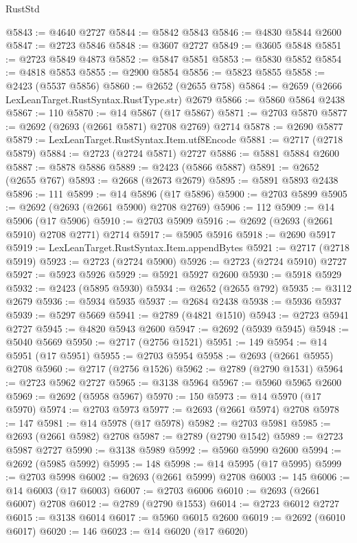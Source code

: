 \begin{lexlean}{RustStd}
\begin{coremodule}
{\begin{coremodule}
{{{{{{{{{{{{{{{{{{{{{{{{{{{{{{{{{{{{{{{@5843 := @4640 @2727
@5844 := @5842 @5843
@5846 := @4830 @5844 @2600
@5847 := @2723 @5846
@5848 := @3607 @2727
@5849 := @3605 @5848
@5851 := @2723 @5849 @4873
@5852 := @5847 @5851
@5853 := @5830 @5852
@5854 := @4818 @5853
@5855 := @2900 @5854
@5856 := @5823 @5855
@5858 := @2423 (@5537 @5856)
@5860 := @2652 (@2655 @758)
@5864 := @2659 (@2666 LexLeanTarget.RustSyntax.RustType.str) @2679
@5866 := @5860 @5864 @2438
@5867 := 110
@5870 := @14 @5867 (@17 @5867)
@5871 := @2703 @5870
@5877 := @2692 (@2693 (@2661 @5871) @2708 @2769) @2714
@5878 := @2690 @5877
@5879 := LexLeanTarget.RustSyntax.Item.utf8Encode
@5881 := @2717 (@2718 @5879)
@5884 := @2723 (@2724 @5871) @2727
@5886 := @5881 @5884 @2600
@5887 := @5878 @5886
@5889 := @2423 (@5866 @5887)
@5891 := @2652 (@2655 @767)
@5893 := @2668 (@2673 @2679)
@5895 := @5891 @5893 @2438
@5896 := 111
@5899 := @14 @5896 (@17 @5896)
@5900 := @2703 @5899
@5905 := @2692 (@2693 (@2661 @5900) @2708 @2769)
@5906 := 112
@5909 := @14 @5906 (@17 @5906)
@5910 := @2703 @5909
@5916 := @2692 (@2693 (@2661 @5910) @2708 @2771) @2714
@5917 := @5905 @5916
@5918 := @2690 @5917
@5919 := LexLeanTarget.RustSyntax.Item.appendBytes
@5921 := @2717 (@2718 @5919)
@5923 := @2723 (@2724 @5900)
@5926 := @2723 (@2724 @5910) @2727
@5927 := @5923 @5926
@5929 := @5921 @5927 @2600
@5930 := @5918 @5929
@5932 := @2423 (@5895 @5930)
@5934 := @2652 (@2655 @792)
@5935 := @3112 @2679
@5936 := @5934 @5935
@5937 := @2684 @2438
@5938 := @5936 @5937
@5939 := @5297 @5669
@5941 := @2789 (@4821 @1510)
@5943 := @2723 @5941 @2727
@5945 := @4820 @5943 @2600
@5947 := @2692 (@5939 @5945)
@5948 := @5040 @5669
@5950 := @2717 (@2756 @1521)
@5951 := 149
@5954 := @14 @5951 (@17 @5951)
@5955 := @2703 @5954
@5958 := @2693 (@2661 @5955) @2708
@5960 := @2717 (@2756 @1526)
@5962 := @2789 (@2790 @1531)
@5964 := @2723 @5962 @2727
@5965 := @3138 @5964
@5967 := @5960 @5965 @2600
@5969 := @2692 (@5958 @5967)
@5970 := 150
@5973 := @14 @5970 (@17 @5970)
@5974 := @2703 @5973
@5977 := @2693 (@2661 @5974) @2708
@5978 := 147
@5981 := @14 @5978 (@17 @5978)
@5982 := @2703 @5981
@5985 := @2693 (@2661 @5982) @2708
@5987 := @2789 (@2790 @1542)
@5989 := @2723 @5987 @2727
@5990 := @3138 @5989
@5992 := @5960 @5990 @2600
@5994 := @2692 (@5985 @5992)
@5995 := 148
@5998 := @14 @5995 (@17 @5995)
@5999 := @2703 @5998
@6002 := @2693 (@2661 @5999) @2708
@6003 := 145
@6006 := @14 @6003 (@17 @6003)
@6007 := @2703 @6006
@6010 := @2693 (@2661 @6007) @2708
@6012 := @2789 (@2790 @1553)
@6014 := @2723 @6012 @2727
@6015 := @3138 @6014
@6017 := @5960 @6015 @2600
@6019 := @2692 (@6010 @6017)
@6020 := 146
@6023 := @14 @6020 (@17 @6020)
}}}}}}}}}}}}}}}}}}}}}}}}}}}}}}}}}}}}}}}
\end{coremodule}}
\end{coremodule}
\end{lexlean}
